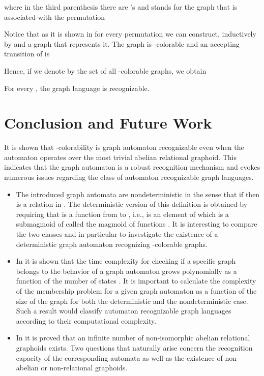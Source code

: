 \documentclass[runningheads,a4paper]{llncs}
\begin{document}
where in the third parenthesis there are  's and  stands for the graph that is associated with the permutation

Notice that as it is shown in \cite{BK1} for every permutation we can construct, inductively by  and  a graph that represents it. The graph  is -colorable and an accepting transition of  is

Hence, if we denote by  the set of all -colorable graphs, we obtain
\begin{theorem}
For every , the graph language  is   recognizable.
\end{theorem}
\section{Conclusion and Future Work}

It is shown that -colorability is graph automaton recognizable even when the automaton operates over the most trivial abelian relational graphoid. This indicates that the graph automaton is a robust recognition mechanism and evokes numerous issues regarding the class of automaton recognizable graph languages.
\begin{itemize}
  \item The introduced graph automata are nondeterministic in the sense that if  then  is a relation in . The deterministic version of this definition is obtained by requiring that  is a function from  to , i.e.,  is an element of  which is a submagmoid of  called the magmoid of functions \cite{BK3}. It is interesting to compare the two classes and in particular to investigate the existence of a deterministic graph automaton recognizing -colorable graphs.
  \item In \cite{BK3} it is shown that the time complexity for checking if a specific graph belongs to the behavior of a graph automaton grows polynomially as a function of the number of states . It is important to calculate the complexity of the membership problem for a given graph automaton as a function of the size of the graph for both the deterministic and the nondeterministic case. Such a result would classify automaton recognizable graph languages according to their computational complexity.
  \item In \cite{Kal2} it is proved that an infinite number of non-isomorphic abelian relational graphoids exists. Two questions that naturally arise  concern  the recognition capacity of the corresponding automata as well as the existence of non-abelian or non-relational graphoids.
\end{itemize}
\end{document}
